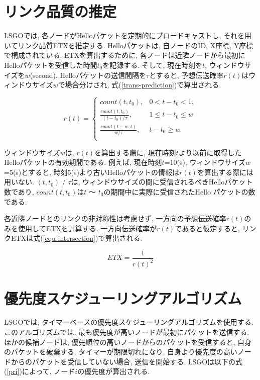 \documentclass[10pt]{jreport}
\begin{document}
\section{リンク品質の推定}
\label{link-quality}
LSGOでは, 各ノードがHelloパケットを定期的にブロードキャストし, それを用いてリンク品質ETXを推定する. Helloパケットは, 自ノードのID, X座標, Y座標で構成されている. ETXを算出するために, 各ノードは近隣ノードから最初にHelloパケットを受信した時間$t_{0}$を記録する. そして, 現在時刻を$t$, ウィンドウサイズを$w$(second), Helloパケットの送信間隔を$\tau$とすると, 予想伝送確率$r(t)$はウィンドウサイズ$w$で場合分けされ, 式(\ref{trans-prediction})で算出される.

\begin{equation}
	\label{trans-prediction}
	r(t) =\begin{cases}count(t, t_{0}), & 0 < t - t_{0} < 1,  \\ \frac{count(t,t_{0})}{(t-t_{0}) / \tau}, & 1 \leq t - t_{0} \leq w\\
		\frac{count(t - w,t)}{w / \tau}, &  t - t_{0} \geq w\\
	\end{cases}
\end{equation}


ウィンドウサイズ$w$は, $r(t)$を算出する際に, 現在時刻$t$より以前に取得したHelloパケットの有効期間である. 例えば, 現在時刻$t$=10(s), ウィンドウサイズ$w$=5(s)とすると, 時刻5(s)より古いHelloパケットの情報は$r(t)$を算出する際には用いない. $(t,t_{0})$ / $\tau$は, ウィンドウサイズの間に受信されるべきHelloパケット数であり, $count(t,t_{0})$は$t$ ～ $t_{0}$の期間中に実際に受信されたHello パケットの数である. \par
各近隣ノードとのリンクの非対称性は考慮せず, 一方向の予想伝送確率$r(t)$のみを使用してETXを計算する. 一方向伝送確率が$r(t)$であると仮定すると, リンクETXは式(\ref{equ-intersection})で算出される.

\begin{equation}
	\label{equ-intersection}
	ETX = \frac{1}{  {r(t)}^{2}   } 
\end{equation}

\section{優先度スケジューリングアルゴリズム}

LSGOでは, タイマーベースの優先度スケジューリングアルゴリズムを使用する. このアルゴリズムでは, 最も優先度が高いノードが最初にパケットを送信する. ほかの候補ノードは, 優先順位の高いノードからのパケットを受信すると, 自身のパケットを破棄する. タイマーが期限切れになり, 自身より優先度の高いノードからのパケットを受信していない場合, 送信を開始する. LSGOは以下の式(\ref{pri})によって, ノード$i$の優先度が算出される.
\end{document}
